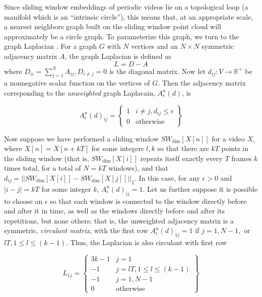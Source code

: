 \documentclass{article}
\begin{document}
Since sliding window embeddings of periodic videos lie on a topological loop (a manifold which is an ``intrinsic circle''), this means that, at an appropriate scale, a nearest neighbors graph built on the sliding window point cloud will approximately be a circle graph.  To parameterize this graph, we turn to the graph Laplacian \cite{chung1997spectral}.  For a graph $G$ with $N$ vertices and an $N \times N$ symmetric adjacency matrix $A$, the graph Laplacian is defined as
\begin{equation}
L = D-A
\end{equation}
where $D_{ii} = \sum_{j = 1}^N A_{ij}, D_{i \neq j} = 0$ is the diagonal matrix.  Now let $d_{ij}: V \rightarrow \mathbb{R}^+$ be a nonnegative scalar function on the vertices of $G$.  Then the adjacency matrix correponding to the {\em unweighted} graph Laplacain, $A_{\epsilon}^u(d)$, is

\begin{equation}
A_{\epsilon}^u(d)_{ij} = \left\{ \begin{array}{cc} 1 & i \neq j, d_{ij} \leq \epsilon \\ 0 & \text{otherwise} \end{array} \right\}
\end{equation}

Now suppose we have performed a sliding window $SW_{\text{dim}}[X[n]]$ for a video $X$, where $X[n] = X[n+kT]$ for some integers $l, k$ so that there are $kT$ points in the sliding window (that is, $SW_{\text{dim}}[X[i]]$ repeats itself exactly every $T$ frames $k$ times total, for a total of $N = kT$ windows), and that $d_{ij} = ||SW_{\text{dim}}[X[i]] - SW_{\text{dim}}[X[j]]||_2$.  In this case, for any $\epsilon > 0$ and $|i - j| = kT$ for some integer $k$, $A^u_{\epsilon}(d)_{ij} = 1$.  Let us further suppose it is possible to choose an $\epsilon$ so that each window is connected to the window directly before and after it in time, as well as the windows directly before and after its repetitions, but none others; that is, the unweighted adjacency matrix is a symmetric, {\em circulant matrix}, with the first row $A_{\epsilon}^u(d)_{1j} = 1$ if $j = 1, N-1,$ or $lT, 1 \leq l \leq (k-1)$.  Thus, the Laplacian is also circulant with first row

\begin{equation}
\label{eq:modellaplacian}
L_{1j} = \left\{ \begin{array}{cc} 3k-1 & j = 1 \\ -1 & j = lT, 1 \leq l \leq (k-1) \\ -1 & j = 1, N-1 \\ 0 & \text{otherwise} \end{array} \right\}
\end{equation}
\end{document}
